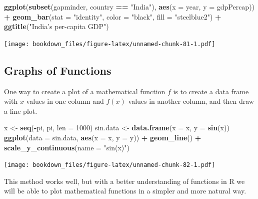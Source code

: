 \documentclass[]{krantz}
\makeatletter
\newenvironment{Shaded}{\begin{snugshade}}{\end{snugshade}}
\newcommand{\KeywordTok}[1]{\textcolor[rgb]{0.27,0.27,0.27}{\textbf{#1}}}
\newcommand{\DataTypeTok}[1]{\textcolor[rgb]{0.27,0.27,0.27}{#1}}
\newcommand{\DecValTok}[1]{\textcolor[rgb]{0.06,0.06,0.06}{#1}}
\newcommand{\StringTok}[1]{\textcolor[rgb]{0.5,0.5,0.5}{#1}}
\newcommand{\OperatorTok}[1]{\textcolor[rgb]{0.43,0.43,0.43}{\textbf{#1}}}
\newcommand{\NormalTok}[1]{#1}
\newenvironment{kframe}{%
\medskip{}
\setlength{\fboxsep}{.8em}
 \def\at@end@of@kframe{}%
 \ifinner\ifhmode%
  \def\at@end@of@kframe{\end{minipage}}%
  \begin{minipage}{\columnwidth}%
 \fi\fi%
 \def\FrameCommand##1{\hskip\@totalleftmargin \hskip-\fboxsep
 \colorbox{shadecolor}{##1}\hskip-\fboxsep
     \hskip-\linewidth \hskip-\@totalleftmargin \hskip\columnwidth}%
 \MakeFramed {\advance\hsize-\width
   \@totalleftmargin\z@ \linewidth\hsize
   \@setminipage}}%
 {\par\unskip\endMakeFramed%
 \at@end@of@kframe}
\renewenvironment{Shaded}{\begin{kframe}}{\end{kframe}}
\makeatother
\begin{document}
\begin{Shaded}
\begin{Highlighting}[]
\KeywordTok{ggplot}\NormalTok{(}\KeywordTok{subset}\NormalTok{(gapminder, country }\OperatorTok{==}\StringTok{ "India"}\NormalTok{), }\KeywordTok{aes}\NormalTok{(}\DataTypeTok{x =}\NormalTok{ year, }\DataTypeTok{y =}\NormalTok{ gdpPercap)) }\OperatorTok{+}\StringTok{ }
\StringTok{    }\KeywordTok{geom_bar}\NormalTok{(}\DataTypeTok{stat =} \StringTok{"identity"}\NormalTok{, }\DataTypeTok{color =} \StringTok{"black"}\NormalTok{, }\DataTypeTok{fill =} \StringTok{"steelblue2"}\NormalTok{) }\OperatorTok{+}\StringTok{ }
\StringTok{    }\KeywordTok{ggtitle}\NormalTok{(}\StringTok{"India's per-capita GDP"}\NormalTok{)}
\end{Highlighting}
\end{Shaded}

\texttt{[image: bookdown\_files/figure-latex/unnamed-chunk-81-1.pdf]}

\subsection{Graphs of Functions}\label{graphs-of-functions}

One way to create a plot of a mathematical function \(f\) is to create a
data frame with \(x\) values in one column and \(f(x)\) values in
another column, and then draw a line plot.

\begin{Shaded}
\begin{Highlighting}[]
\NormalTok{x <-}\StringTok{ }\KeywordTok{seq}\NormalTok{(}\OperatorTok{-}\NormalTok{pi, pi, }\DataTypeTok{len =} \DecValTok{1000}\NormalTok{)}
\NormalTok{sin.data <-}\StringTok{ }\KeywordTok{data.frame}\NormalTok{(}\DataTypeTok{x =}\NormalTok{ x, }\DataTypeTok{y =} \KeywordTok{sin}\NormalTok{(x))}
\KeywordTok{ggplot}\NormalTok{(}\DataTypeTok{data =}\NormalTok{ sin.data, }\KeywordTok{aes}\NormalTok{(}\DataTypeTok{x =}\NormalTok{ x, }\DataTypeTok{y =}\NormalTok{ y)) }\OperatorTok{+}\StringTok{ }\KeywordTok{geom_line}\NormalTok{() }\OperatorTok{+}\StringTok{ }
\StringTok{    }\KeywordTok{scale_y_continuous}\NormalTok{(}\DataTypeTok{name =} \StringTok{"sin(x)"}\NormalTok{)}
\end{Highlighting}
\end{Shaded}

\texttt{[image: bookdown\_files/figure-latex/unnamed-chunk-82-1.pdf]}

This method works well, but with a better understanding of functions in
R we will be able to plot mathematical functions in a simpler and more
natural way.
\end{document}
